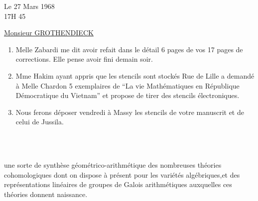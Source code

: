\begin{flushright}
Le 27 Mars 1968\\
17H 45\\
\end{flushright}

\begin{center}
\uline{Monsieur GROTHENDIECK}\\
\end{center}

\begin{enumerate}[label=\arabic*.]
\item Melle Zabardi me dit avoir refait dans le détail 6 pages de vos 17 pages de corrections. Elle pense avoir fini demain soir.

\item Mme Hakim ayant appris que les stencils sont stockés Rue de Lille a demandé à Melle Chardon 5 exemplaires de ``La vie Mathématiques en République Démocratique du Vietnam'' et propose de tirer des stencils électroniques.

\item Nous ferons déposer vendredi à Massy les stencils de votre manuscrit et de celui de Jussila.
\end{enumerate}

\begin{flushright}
\\
\\
\end{flushright}

une sorte de synthèse géométrico-arithmétique des nombreuses théories cohomologiques dont on dispose à présent pour les variétés algébriques,et des représentations linéaires de groupes de Galois arithmétiques auxquelles ces théories donnent naissance.

